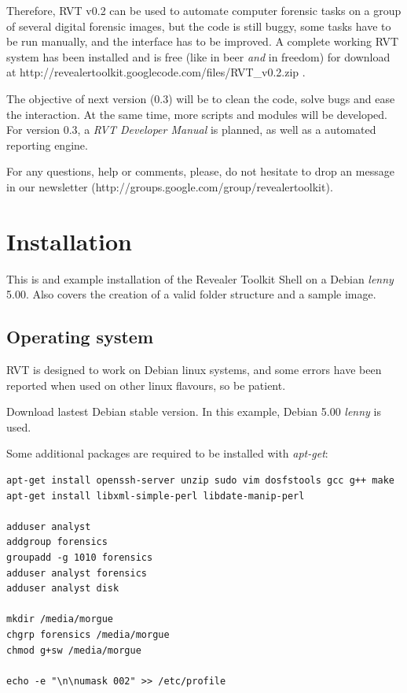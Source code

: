 \documentclass[a4paper,11pt,oneside]{report}
\begin{document}
Therefore, RVT v0.2 can be used to automate computer forensic tasks on a group of several digital forensic images, but the code is still buggy, some tasks have to be run manually, and the interface has to be improved. A complete working RVT system has been installed and is free (like in beer \emph{and} in freedom) for download at  http://revealertoolkit.googlecode.com/files/RVT\_v0.2.zip .

The objective of next version (0.3) will be to clean the code, solve bugs and ease the interaction. At the same time, more scripts and modules will be developed. For version 0.3, a \emph{RVT Developer Manual} is planned, as well as a automated reporting engine.

For any questions, help or comments, please, do not hesitate to drop an message in our newsletter (http://groups.google.com/group/revealertoolkit).





\chapter{Installation} \label{sec:installation}

This is and example installation of the Revealer Toolkit Shell on a Debian \emph{lenny} 5.00. Also covers the creation of a valid folder structure and a sample image.

\section{Operating system}

RVT is designed to work on Debian linux systems, and some errors have been reported when used on other linux flavours, so be patient.  

Download lastest Debian stable version. In this example, Debian 5.00 \emph{lenny} is used.

Some additional packages are required to be installed with \emph{apt-get}:

\begin{verbatim}
apt-get install openssh-server unzip sudo vim dosfstools gcc g++ make
apt-get install libxml-simple-perl libdate-manip-perl 

adduser analyst
addgroup forensics
groupadd -g 1010 forensics
adduser analyst forensics
adduser analyst disk

mkdir /media/morgue
chgrp forensics /media/morgue
chmod g+sw /media/morgue

echo -e "\n\numask 002" >> /etc/profile
\end{verbatim}
\end{document}
